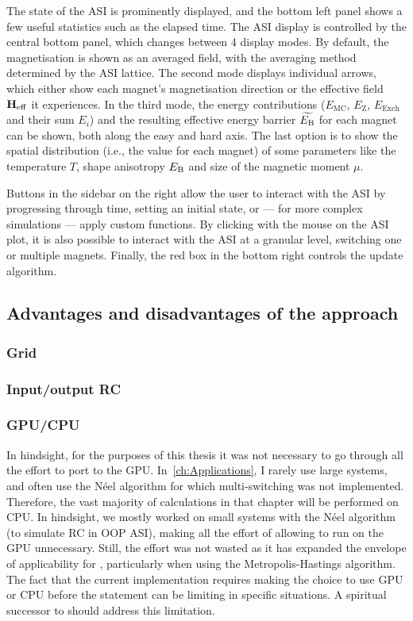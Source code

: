 The state of the ASI is prominently displayed, and the bottom left panel shows a few useful statistics such as the elapsed time. The ASI display is controlled by the central bottom panel, which changes between 4 display modes.
By default, the magnetisation is shown as an averaged field, with the averaging method determined by the ASI lattice.
The second mode displays individual arrows, which either show each magnet's magnetisation direction or the effective field $\boldsymbol{\mathbf{H}}_\mathrm{eff}$ it experiences. %
In the third mode, the energy contributions ($E_\mathrm{MC}$, $E_\mathrm{Z}$, $E_\mathrm{Exch}$ and their sum $E_i$) and the resulting effective energy barrier $\widetilde{E_\mathrm{B}}$ for each magnet can be shown, both along the easy and hard axis.
The last option is to show the spatial distribution (i.e., the value for each magnet) of some parameters like the temperature $T$, shape anisotropy $E_\mathrm{B}$ and size of the magnetic moment $\mu$. \par
Buttons in the sidebar on the right allow the user to interact with the ASI by progressing through time, setting an initial state, or --- for more complex simulations --- apply custom functions.
By clicking with the mouse on the ASI plot, it is also possible to interact with the ASI at a granular level, switching one or multiple magnets. Finally, the red box in the bottom right controls the update algorithm.

\subsection{Advantages and disadvantages of the \hotspice approach} %
\subsubsection{Grid}
\subsubsection{Input/output RC}
\subsubsection{GPU/CPU}
In hindsight, for the purposes of this thesis it was not necessary to go through all the effort to port \hotspice to the GPU.
In~\cref{ch:Applications}, I rarely use large systems, and often use the N\'eel algorithm for which multi-switching was not implemented.
Therefore, the vast majority of calculations in that chapter will be performed on CPU. 
In hindsight, we mostly worked on small systems with the N\'eel algorithm (to simulate RC in OOP ASI), making all the effort of allowing \hotspice to run on the GPU unnecessary. Still, the effort was not wasted as it has expanded the envelope of applicability for \hotspice, particularly when using the Metropolis-Hastings algorithm.
The fact that the current implementation requires making the choice to use GPU or CPU before the  statement can be limiting in specific situations. A spiritual successor to \hotspice should address this limitation.

